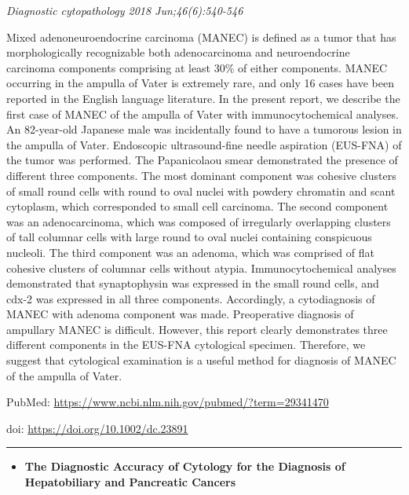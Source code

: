\documentclass[]{article}
\providecommand{\tightlist}{%
  \setlength{\itemsep}{0pt}\setlength{\parskip}{0pt}}
\begin{document}
\emph{Diagnostic cytopathology 2018 Jun;46(6):540-546}

Mixed adenoneuroendocrine carcinoma (MANEC) is defined as a tumor that
has morphologically recognizable both adenocarcinoma and neuroendocrine
carcinoma components comprising at least 30\% of either components.
MANEC occurring in the ampulla of Vater is extremely rare, and only 16
cases have been reported in the English language literature. In the
present report, we describe the first case of MANEC of the ampulla of
Vater with immunocytochemical analyses. An 82-year-old Japanese male was
incidentally found to have a tumorous lesion in the ampulla of Vater.
Endoscopic ultrasound-fine needle aspiration (EUS-FNA) of the tumor was
performed. The Papanicolaou smear demonstrated the presence of different
three components. The most dominant component was cohesive clusters of
small round cells with round to oval nuclei with powdery chromatin and
scant cytoplasm, which corresponded to small cell carcinoma. The second
component was an adenocarcinoma, which was composed of irregularly
overlapping clusters of tall columnar cells with large round to oval
nuclei containing conspicuous nucleoli. The third component was an
adenoma, which was comprised of flat cohesive clusters of columnar cells
without atypia. Immunocytochemical analyses demonstrated that
synaptophysin was expressed in the small round cells, and cdx-2 was
expressed in all three components. Accordingly, a cytodiagnosis of MANEC
with adenoma component was made. Preoperative diagnosis of ampullary
MANEC is difficult. However, this report clearly demonstrates three
different components in the EUS-FNA cytological specimen. Therefore, we
suggest that cytological examination is a useful method for diagnosis of
MANEC of the ampulla of Vater.

PubMed: \url{https://www.ncbi.nlm.nih.gov/pubmed/?term=29341470}

doi: \url{https://doi.org/10.1002/dc.23891}

{}

{}

\begin{center}\rule{0.5\linewidth}{\linethickness}\end{center}

\begin{itemize}
\tightlist
\item
  \textbf{The Diagnostic Accuracy of Cytology for the Diagnosis of
  Hepatobiliary and Pancreatic Cancers}
\end{itemize}
\end{document}
